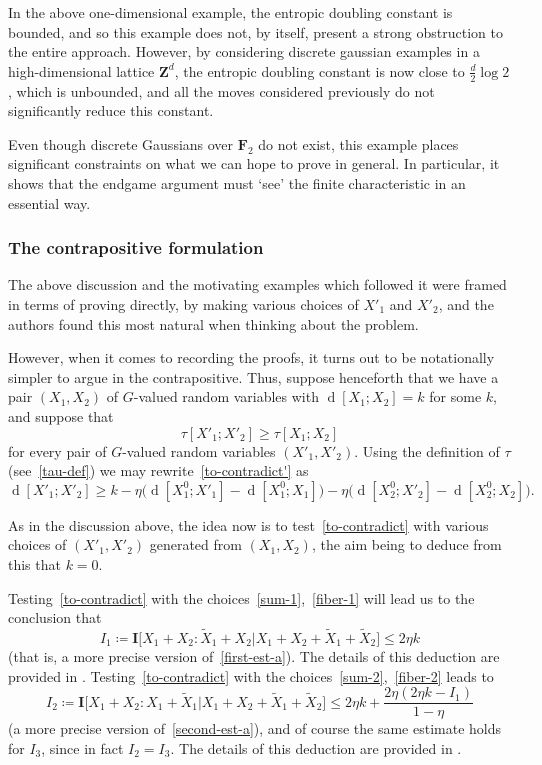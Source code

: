 \documentclass[12pt,reqno,tbtags]{amsart}
\theoremstyle{definition}
\theoremstyle{remark}
\renewcommand{\leq}{\leqslant}
\renewcommand{\geq}{\geqslant}
\def\F{\mathbf{F}}
\def\Z{\mathbf{Z}}
\newcommand{\bigI}[1]{\mathbf{I}\big[#1\big]}
\newcommand{\dist}[2]{{\operatorname{d}[#1;#2]}} %
\newcommand{\costa}[1]{\eta\bigl(\dist{X_1^0}{#1} - \dist{X_1^0}{X_1}\bigr)} %
\newcommand{\costb}[1]{\eta\bigl(\dist{X_2^0}{#1} - \dist{X_2^0}{X_2}\bigr)} %
\numberwithin{equation}{section}
\begin{document}
In the above one-dimensional example, the entropic doubling constant is bounded, and so this example does not, by itself, present a strong obstruction to the entire approach.  However, by considering discrete gaussian examples in a high-dimensional lattice $\Z^d$, the entropic doubling constant is now close to $\frac{d}{2} \log 2$, which is unbounded, and all the moves considered previously do not significantly reduce this constant.

Even though discrete Gaussians over $\F_2$ do not exist, this example places significant constraints on what we can hope to prove in general.  In particular, it shows that the endgame argument must `see' the finite characteristic in an essential way.

\subsubsection*{The contrapositive formulation}
The above discussion and the motivating examples which followed it were framed in terms of proving  directly, by making various choices of $X'_1$ and $X'_2$, and the authors found this most natural when thinking about the problem.

However, when it comes to recording the proofs, it turns out to be notationally simpler to argue in the contrapositive.
Thus, suppose henceforth that we have a pair $(X_1, X_2)$ of $G$-valued random variables with $\dist{X_1}{X_2} = k$ for some $k$, and suppose that
\begin{equation}
  \label{to-contradict'}
  \tau[X'_1;X'_2] \geq \tau[X_1;X_2]
\end{equation} for every pair of $G$-valued random variables $(X'_1, X'_2)$.  Using the definition of $\tau$ (see~\eqref{tau-def}) we may rewrite~\eqref{to-contradict'} as
\begin{equation}\label{to-contradict}
  \dist{X'_1}{X'_2} \geq k - \costa{X'_1} - \costb{X'_2}.
\end{equation}

As in the discussion above, the idea now is to test~\eqref{to-contradict} with various choices of $(X'_1, X'_2)$ generated from $(X_1, X_2)$, the aim being to deduce from this that $k = 0$.

Testing~\eqref{to-contradict} with the choices~\eqref{sum-1},~\eqref{fiber-1} will lead us to the conclusion that
\begin{equation}\label{first-est}
  I_1 \coloneqq \bigI{ X_1+X_2 : \tilde X_1 + X_2 | X_1+X_2+\tilde X_1+\tilde X_2 } \leq 2 \eta k
\end{equation}
(that is, a more precise version of~\eqref{first-est-a}). The details of this deduction are provided in . Testing~\eqref{to-contradict} with the choices~\eqref{sum-2},~\eqref{fiber-2} leads to
\begin{equation}\label{second-est}
  I_2 \coloneqq \bigI{ X_1+X_2 : X_1 + \tilde X_1 | X_1+X_2+\tilde X_1+\tilde X_2 } \leq 2 \eta k + \frac{2 \eta (2 \eta k - I_1)}{1 - \eta}
  \end{equation}
(a more precise version of~\eqref{second-est-a}), and of course the same estimate holds for $I_3$, since in fact $I_2=I_3$. The details of this deduction are provided in .
\end{document}
